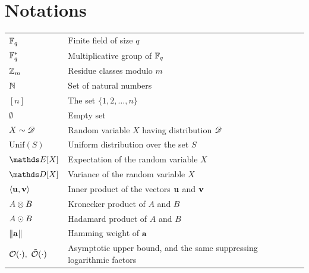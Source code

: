 %
%
%

\chapter*{Notations}

\begin{longtable}{@{} l p{9cm} @{}}
$\mathbb{F}_q$ & Finite field of size $q$ \\[0.4em]
$\mathbb{F}_q^*$ & Multiplicative group of $\mathbb{F}_q$ \\[0.4em]
$\mathbb{Z}_m$ & Residue classes modulo $m$ \\[0.4em]
$\mathbb{N}$ & Set of natural numbers \\[0.4em]
$[n]$ & The set $\{1, 2, \dots, n\}$ \\[0.4em]
$\emptyset$ & Empty set \\[0.4em]
$X \sim \mathscr{D}$ & Random variable $X$ having distribution $\mathscr{D}$ \\[0.4em]
$\mathrm{Unif}(S)$ & Uniform distribution over the set $S$ \\[0.4em]
$\E[X]$ & Expectation of the random variable $X$ \\[0.4em]
$\D[X]$ & Variance of the random variable $X$ \\[0.4em]
$\langle \mathbf{u}, \mathbf{v} \rangle$ & Inner product of the vectors $\mathbf{u}$ and $\mathbf{v}$ \\[0.4em]
$A \otimes B$ & Kronecker product of $A$ and $B$ \\[0.4em]
$A \odot B$ & Hadamard product of $A$ and $B$ \\[0.4em]
$\|\mathbf{a}\|$ & Hamming weight of $\mathbf{a}$ \\[0.4em]
$\O(\cdot),\ \tO(\cdot)$ & Asymptotic upper bound, and the same suppressing logarithmic factors \\[0.4em]
\end{longtable}